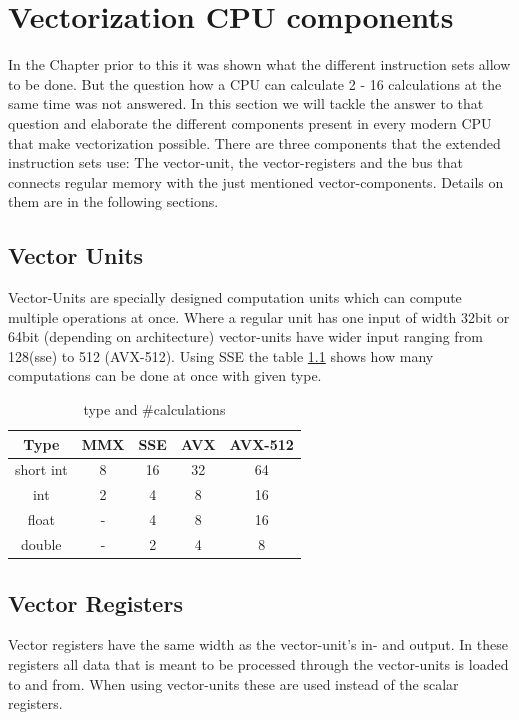 \documentclass[
	12pt,
	a4paper,
	BCOR10mm,
	DIV14,
	headsepline,
	usegeometry,
]{scrreprt}
\begin{document}
\chapter{Vectorization CPU components}
In the Chapter prior to this it was shown what the different instruction sets allow to be done. But
the question how a CPU can calculate 2 - 16 calculations at the same time was
not answered. In this section we will tackle the answer to that question and elaborate the
different components present in every modern CPU that make vectorization possible.
There are three components that the extended instruction sets use: The vector-unit, the
vector-registers and the bus that connects regular memory with the just mentioned
vector-components. Details on them are in the following sections. \cite{IntelSIMDdef}
\section{Vector Units}
Vector-Units are specially designed computation units which can compute multiple operations at
once. Where a regular unit has one input of width 32bit or 64bit (depending on architecture)
vector-units have wider input ranging from 128(sse) to 512 (AVX-512). Using SSE the table
\ref{table:tac} shows how many computations can be done at once with given type.
\begin{table}[ht]
    \centering
        \begin{tabular}{c|c|c|c|c}
            Type      & MMX & SSE & AVX & AVX-512\\
            \hline
            short int & 8   & 16  & 32  & 64 \\
            \hline
            int       & 2   & 4   & 8   & 16 \\
            \hline
            float     & -   & 4   & 8   & 16 \\
            \hline
            double    & -   & 2   & 4   & 8\\
        \end{tabular} 
            \caption{type and \#calculations}
        \label{table:tac}
    \end{table}
\section{Vector Registers}
Vector registers have the same width as the vector-unit's in- and output. In these registers all
data that is meant to be processed through the vector-units is loaded to and from. When using
vector-units these are used instead of the scalar registers.
\end{document}
